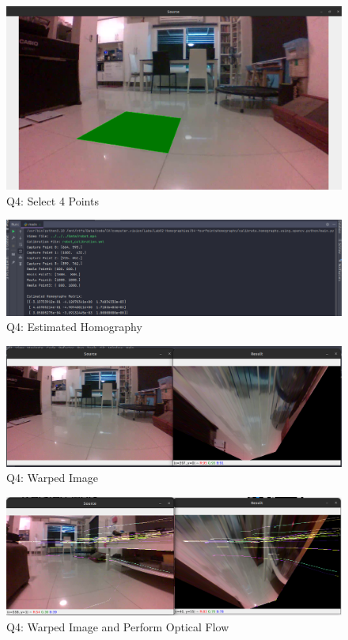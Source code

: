 \documentclass[a4paper,12pt]{article}
\begin{document}
\begin{figure}
	\caption{Q4: Select 4 Points}
	\includegraphics*[scale=0.275]{img/Q4.png}
\end{figure}

\begin{figure}
	\caption{Q4: Estimated Homography}
	\includegraphics*[scale=0.25]{img/Q4-1.png}
\end{figure}

\begin{figure}
	\caption{Q4: Warped Image}
	\includegraphics*[scale=0.275]{img/Q4-2.png}
\end{figure}

\begin{figure}
	\caption{Q4: Warped Image and Perform Optical Flow}
	\includegraphics*[scale=0.275]{img/Q4-3.png}
\end{figure}
\end{document}
